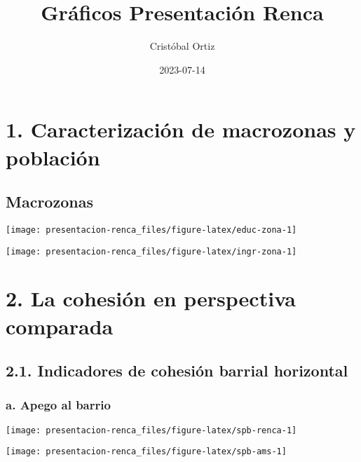 \documentclass[
]{article}
\title{Gráficos Presentación Renca}
\author{Cristóbal Ortiz}
\date{2023-07-14}
\begin{document}
\maketitle

\hypertarget{caracterizaciuxf3n-de-macrozonas-y-poblaciuxf3n}{%
\section{1. Caracterización de macrozonas y
población}\label{caracterizaciuxf3n-de-macrozonas-y-poblaciuxf3n}}

\hypertarget{macrozonas}{%
\subsection{Macrozonas}\label{macrozonas}}

\begin{flushleft}\texttt{[image: presentacion-renca\_files/figure-latex/educ-zona-1]} \end{flushleft}

\begin{flushleft}\texttt{[image: presentacion-renca\_files/figure-latex/ingr-zona-1]} \end{flushleft}

\hypertarget{la-cohesiuxf3n-en-perspectiva-comparada}{%
\section{2. La cohesión en perspectiva
comparada}\label{la-cohesiuxf3n-en-perspectiva-comparada}}

\hypertarget{indicadores-de-cohesiuxf3n-barrial-horizontal}{%
\subsection{2.1. Indicadores de cohesión barrial
horizontal}\label{indicadores-de-cohesiuxf3n-barrial-horizontal}}

\hypertarget{a.-apego-al-barrio}{%
\subsubsection{a. Apego al barrio}\label{a.-apego-al-barrio}}

\begin{flushleft}\texttt{[image: presentacion-renca\_files/figure-latex/spb-renca-1]} \end{flushleft}

\begin{flushleft}\texttt{[image: presentacion-renca\_files/figure-latex/spb-ams-1]} \end{flushleft}
\end{document}
